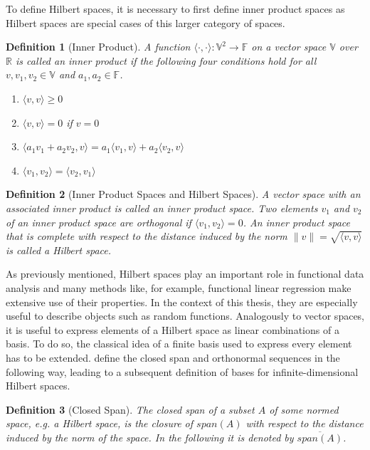 \documentclass[12pt, a4paper]{article}
\theoremstyle{MAstyle} \newtheorem{assumption}{Assumption}[section]
\theoremstyle{MAstyle} \newtheorem{definition}{Definition}[section]
\theoremstyle{MAstyle} \newtheorem{theorem}{Theorem}[section]
\begin{document}
			To define Hilbert spaces, it is necessary to first define inner product spaces as Hilbert spaces are special cases of this larger category of spaces.
			\begin{definition}[Inner Product]
				A function $\langle \cdot , \cdot \rangle : \mathbb{V}^2 \rightarrow \mathbb{F}$ on a vector space $\mathbb{V}$ over $\mathbb{R}$ is called an inner product if the following four conditions hold for all $v, v_1, v_2 \in \mathbb{V}$ and $a_1, a_2 \in \mathbb{F}$.
				\begin{multicols}{2}
					\begin{enumerate}
						\item $\langle v,v \rangle \geq 0$
						\item $\langle v,v \rangle = 0$ if $v = 0$
						\item $\langle a_1 v_1 + a_2 v_2, v \rangle = a_1 \langle v_1, v \rangle + a_2 \langle v_2, v \rangle$
						\item $\langle v_1, v_2 \rangle = \langle v_2, v_1 \rangle$
					\end{enumerate}
				\end{multicols}
			\end{definition}
			
			\begin{definition}[Inner Product Spaces and Hilbert Spaces]
				A vector space with an associated inner product is called an inner product space. Two elements $v_1$ and $v_2$ of an inner product space are orthogonal if $\langle v_1, v_2 \rangle = 0$.
				An inner product space that is complete with respect to the distance induced by the norm $\| v \| = \sqrt{\langle v, v\rangle}$ is called a Hilbert space.
			\end{definition}
			As previously mentioned, Hilbert spaces play an important role in functional data analysis and many methods like, for example, functional linear regression make extensive use of their properties. In the context of this thesis, they are especially useful to describe objects such as random functions.
			Analogously to vector spaces, it is useful to express elements of a Hilbert space as linear combinations of a basis. To do so, the classical idea of a finite basis used to express every element has to be extended. \cite{hsing_theoretical_2015} define the closed span and orthonormal sequences in the following way, leading to a subsequent definition of bases for infinite-dimensional Hilbert spaces.
		
			\begin{definition}[Closed Span]
				The closed span of a subset $A$ of some normed space, e.g. a Hilbert space, is the closure of $\textit{span}\left(A\right)$ with respect to the distance induced by the norm of the space. In the following it is denoted by $\overline{{\textit{span}\left(A\right)}}$.
			\end{definition}
		
\end{document}

